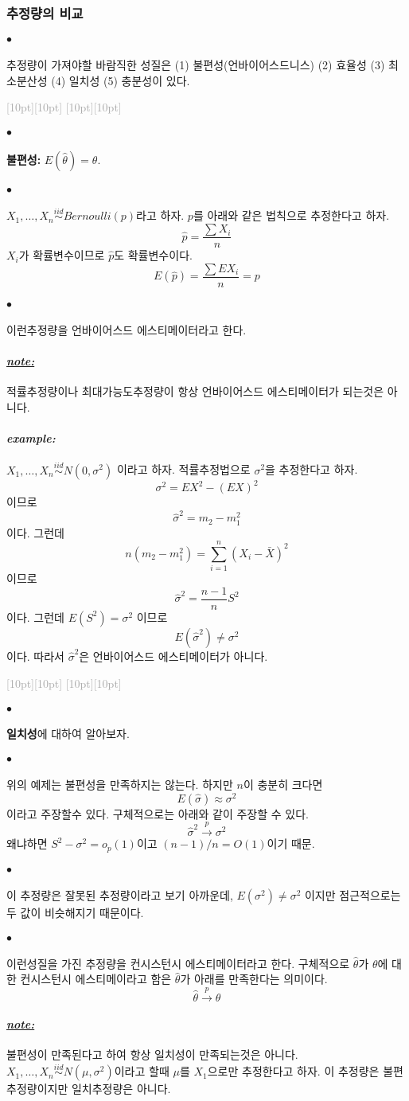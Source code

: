 \documentclass[12pt,oneside,english]{book}
\newcommand{\rdash}{\noindent \textcolor{darkgray}{ \raisebox{-1.9pt}[10pt][10pt]{\leafright} \hrulefill \raisebox{-1.9pt}[10pt][10pt]{\leafright \decofourleft \decothreeleft  \aldineright \decotwo \floweroneleft \decoone}}}
\def\ck{\paragraph{\Large$\bullet$}\Large}
\def\note{\paragraph{\Large\textit{\underline{note:}}}\Large}
\def\ex{\paragraph{\Large\textit{example:}}\Large}
\begin{document}
\subsubsection{추정량의 비교}

\ck 추정량이 가져야할 바람직한 성질은 (1) 불편성(언바이어스드니스) (2) 효율성 (3) 최소분산성 (4) 일치성 (5) 충분성이 있다. 

\rdash 

\ck \textbf{불편성:} $E(\hat\theta)=\theta$. 

\ck $X_1,\dots,X_n \overset{iid}{\sim} Bernoulli(p)$라고 하자. $p$를 아래와 같은 법칙으로 추정한다고 하자. 
\[
\hat{p}=\frac{\sum X_i}{n}
\]
$X_i$가 확률변수이므로 $\hat{p}$도 확률변수이다. 
\[
E(\hat{p})=\frac{\sum E X_i}{n}= p
\]

\ck 이런추정량을 언바이어스드 에스티메이터라고 한다.  

\note 적률추정량이나 최대가능도추정량이 항상 언바이어스드 에스티메이터가 되는것은 아니다. 

\ex $X_1,\dots,X_n \overset{iid}{\sim} N(0,\sigma^2)$ 이라고 하자. 적률추정법으로 $\sigma^2$을 추정한다고 하자. 
\[
\sigma^2=EX^2-(EX)^2
\]
이므로 
\[
\hat\sigma^2=m_2-m_1^2
\]
이다. 그런데 
\[
n(m_2-m_1^2)=\sum_{i=1}^{n}(X_i-\bar{X})^2
\]
이므로 
\[
\hat\sigma^2=\frac{n-1}{n}S^2
\]
이다. 그런데 $E(S^2)=\sigma^2$ 이므로
\[
E(\hat\sigma^2)\neq\sigma^2
\]
이다. 따라서 $\hat\sigma^2$은 언바이어스드 에스티메이터가 아니다. 

\rdash 

\ck \textbf{일치성}에 대하여 알아보자. 

\ck 위의 예제는 불편성을 만족하지는 않는다. 하지만 $n$이 충분히 크다면 
\[
E(\hat \sigma) \approx \sigma^2
\]
이라고 주장할수 있다. 구체적으로는 아래와 같이 주장할 수 있다. 
\[
\hat\sigma^2 \overset{p}{\to} \sigma^2
\]
왜냐하면 $S^2-\sigma^2=o_p(1)$이고 $(n-1)/n=O(1)$이기 때문. 

\ck 이 추정량은 잘못된 추정량이라고 보기 아까운데, $E(\sigma^2)\neq \sigma^2$ 이지만 점근적으로는 두 값이 비슷해지기 때문이다. 

\ck 이런성질을 가진 추정량을 컨시스턴시 에스티메이터라고 한다. 구체적으로 $\hat\theta$가 $\theta$에 대한 컨시스턴시 에스티메이라고 함은 $\hat\theta$가 아래를 만족한다는 의미이다. 
\[
\hat\theta \overset{p}{\to} \theta
\]

\note 불편성이 만족된다고 하여 항상 일치성이 만족되는것은 아니다. $X_1,\dots,X_n \overset{iid}{\sim} N(\mu,\sigma^2)$이라고 할때 $\mu$를 $X_1$으로만 추정한다고 하자. 이 추정량은 불편추정량이지만 일치추정량은 아니다. 
\end{document}
